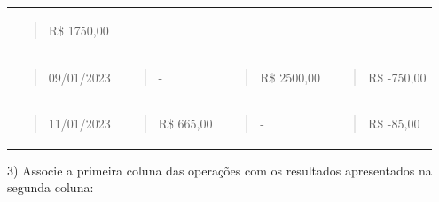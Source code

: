 \begin{longtable}[]{@{}llll@{}}
\begin{minipage}[t]{0.20\columnwidth}
\begin{quote}
R\$ 1750,00
\end{quote}\strut
\end{minipage}\tabularnewline
\begin{minipage}[t]{0.18\columnwidth}\raggedright
\begin{quote}
09/01/2023
\end{quote}\strut
\end{minipage} & \begin{minipage}[t]{0.20\columnwidth}\raggedright
\begin{quote}
-
\end{quote}\strut
\end{minipage} & \begin{minipage}[t]{0.20\columnwidth}\raggedright
\begin{quote}
R\$ 2500,00
\end{quote}\strut
\end{minipage} & \begin{minipage}[t]{0.20\columnwidth}\raggedright
\begin{quote}
R\$ -750,00
\end{quote}\strut
\end{minipage}\tabularnewline
\begin{minipage}[t]{0.18\columnwidth}\raggedright
\begin{quote}
11/01/2023
\end{quote}\strut
\end{minipage} & \begin{minipage}[t]{0.20\columnwidth}\raggedright
\begin{quote}
R\$ 665,00
\end{quote}\strut
\end{minipage} & \begin{minipage}[t]{0.20\columnwidth}\raggedright
\begin{quote}
-
\end{quote}\strut
\end{minipage} & \begin{minipage}[t]{0.20\columnwidth}\raggedright
\begin{quote}
R\$ -85,00
\end{quote}\strut
\end{minipage}\tabularnewline
\bottomrule
\end{longtable}

3) Associe a primeira coluna das operações com os resultados
apresentados na segunda coluna:

